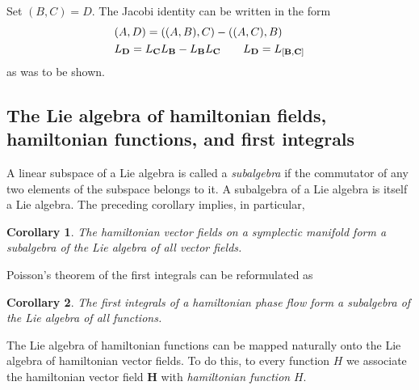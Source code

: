 \documentclass{book}
\numberwithin{equation}{section}
\theoremstyle{plain}
\newtheorem{cor}{Corollary}
\let\oldendproof\endproof
\renewenvironment{proof}[1][\proofname]{%
  \oldproof[\textsc{#1}]%
}{\oldendproof}
\theoremstyle{definition}
\theoremstyle{remark}
\theoremstyle{smallcap}
\numberwithin{prob}{section}
\begin{document}
\begin{proof}
  Set $(B, C) = D$.
  The Jacobi identity can be written in the form
  \begin{align}
    &(A, D) = ((A, B), C) - ((A, C), B)
    \label{eq:jacobi_D} \\
    &L_\mathbf{D} = L_\mathbf{C} L_\mathbf{B} - L_\mathbf{B} L_\mathbf{C}
    \qquad L_\mathbf{D} = L_{[\mathbf B, \mathbf C]}
    \notag
  \end{align}
  as was to be shown.

\end{proof}


\subsection{The Lie algebra of hamiltonian fields,
hamiltonian functions, and first integrals}

A linear subspace of a Lie algebra is called a \emph{subalgebra}
if the commutator of any two elements of the subspace
belongs to it.
%
A subalgebra of a Lie algebra is itself a Lie algebra.
%
The preceding corollary implies, in particular,

\begin{cor}
  The hamiltonian vector fields on a symplectic manifold
  form a subalgebra of the Lie algebra of all vector fields.
\end{cor}

Poisson's theorem of the first integrals
can be reformulated as

\begin{cor}
  The first integrals of a hamiltonian phase flow
  form a subalgebra of the Lie algebra of all functions.
\end{cor}

The Lie algebra of hamiltonian functions can be
mapped naturally onto the Lie algebra of hamiltonian
vector fields.
%
To do this, to every function $H$ we associate the hamiltonian
vector field $\mathbf H$ with \emph{hamiltonian function} $H$.
\end{document}
